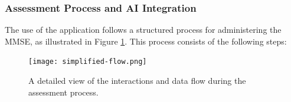 \subsubsection{Assessment Process and AI Integration}

The use of the application follows a structured process for administering the MMSE, as illustrated in Figure \ref{fig:assessment-flow}. This process consists of the following steps:

\begin{figure}[h!]
\begin{center}
\texttt{[image: simplified-flow.png]}
\caption{A detailed view of the interactions and data flow during the assessment process.}
\label{fig:assessment-flow}
\end{center}
\end{figure}

